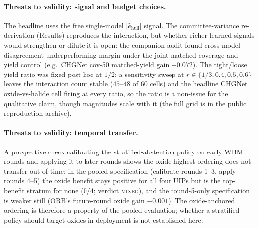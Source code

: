 \documentclass[aip,jcp,preprint,superscriptaddress,amsmath,amssymb]{revtex4-2}
\begin{document}
\paragraph{Threats to validity: signal and budget choices.} The headline uses the free
single-model $|\hat{e}_{\mathrm{hull}}|$ signal. The committee-variance re-derivation
(Results) reproduces the interaction, but whether richer learned signals would strengthen or
dilute it is open: the companion audit found cross-model disagreement underperforming margin
under the joint matched-coverage-and-yield control (e.g.\ CHGNet cov-50 matched-yield gain
$-0.072$). The tight/loose yield ratio was fixed post hoc at $1/2$; a sensitivity sweep at
$r \in \{1/3, 0.4, 0.5, 0.6\}$ leaves the interaction count stable ($45$--$48$ of $60$ cells)
and the headline CHGNet oxide-vs-halide cell firing at every ratio, so the ratio is a
non-issue for the qualitative claim, though magnitudes scale with it (the full grid is in the
public reproduction archive).

\paragraph{Threats to validity: temporal transfer.} A prospective check calibrating the
stratified-abstention policy on early WBM rounds and applying it to later rounds shows the
oxide-highest ordering does not transfer out-of-time: in the pooled specification (calibrate
rounds 1--3, apply rounds 4--5) the oxide benefit stays positive for all four UIPs but is the
top-benefit stratum for none ($0/4$; verdict \textsc{mixed}), and the round-5-only
specification is weaker still (ORB's future-round oxide gain $-0.001$). The oxide-anchored
ordering is therefore a property of the pooled evaluation; whether a stratified policy should
target oxides in deployment is not established here.
\end{document}
